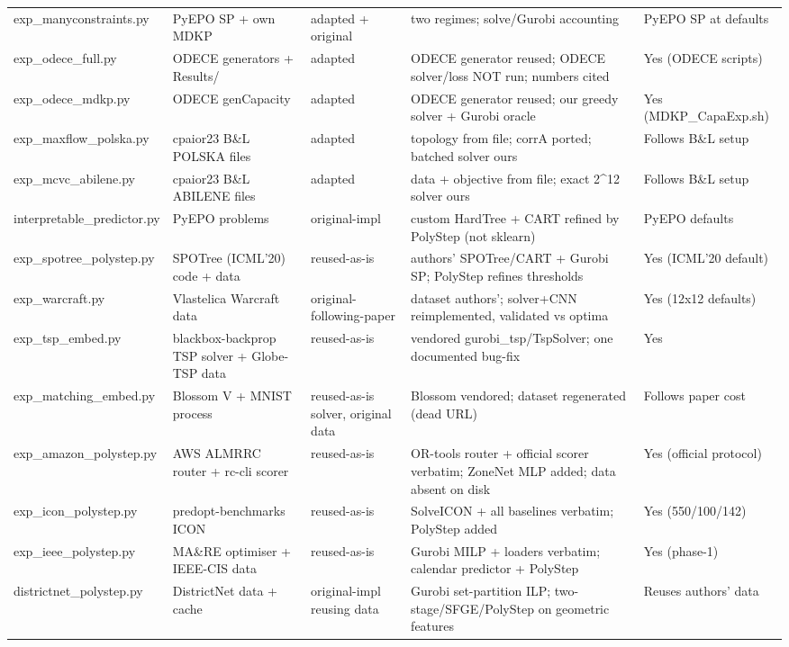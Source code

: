 \documentclass[10pt]{article}
\begin{document}
{\begin{longtable}{p{}p{}p{}p{}p{}}
exp\_manyconstraints.py & PyEPO SP + own MDKP & adapted + original & two regimes; solve/Gurobi accounting & PyEPO SP at defaults \\
exp\_odece\_full.py & ODECE generators + Results/ & adapted & ODECE generator reused; ODECE solver/loss NOT run; numbers cited & Yes (ODECE scripts) \\
exp\_odece\_mdkp.py & ODECE genCapacity & adapted & ODECE generator reused; our greedy solver + Gurobi oracle & Yes (MDKP\_CapaExp.sh) \\
exp\_maxflow\_polska.py & cpaior23 B\&L POLSKA files & adapted & topology from file; corrA ported; batched solver ours & Follows B\&L setup \\
exp\_mcvc\_abilene.py & cpaior23 B\&L ABILENE files & adapted & data + objective from file; exact 2\textasciicircum{}12 solver ours & Follows B\&L setup \\
interpretable\_predictor.py & PyEPO problems & original-impl & custom HardTree + CART refined by PolyStep (not sklearn) & PyEPO defaults \\
exp\_spotree\_polystep.py & SPOTree (ICML'20) code + data & reused-as-is & authors' SPOTree/CART + Gurobi SP; PolyStep refines thresholds & Yes (ICML'20 default) \\
exp\_warcraft.py & Vlastelica Warcraft data & original-following-paper & dataset authors'; solver+CNN reimplemented, validated vs optima & Yes (12x12 defaults) \\
exp\_tsp\_embed.py & blackbox-backprop TSP solver + Globe-TSP data & reused-as-is & vendored gurobi\_tsp/TspSolver; one documented bug-fix & Yes \\
exp\_matching\_embed.py & Blossom V + MNIST process & reused-as-is solver, original data & Blossom vendored; dataset regenerated (dead URL) & Follows paper cost \\
exp\_amazon\_polystep.py & AWS ALMRRC router + rc-cli scorer & reused-as-is & OR-tools router + official scorer verbatim; ZoneNet MLP added; data absent on disk & Yes (official protocol) \\
exp\_icon\_polystep.py & predopt-benchmarks ICON & reused-as-is & SolveICON + all baselines verbatim; PolyStep added & Yes (550/100/142) \\
exp\_ieee\_polystep.py & MA\&RE optimiser + IEEE-CIS data & reused-as-is & Gurobi MILP + loaders verbatim; calendar predictor + PolyStep & Yes (phase-1) \\
districtnet\_polystep.py & DistrictNet data + cache & original-impl reusing data & Gurobi set-partition ILP; two-stage/SFGE/PolyStep on geometric features & Reuses authors' data \\

\end{longtable}}
\end{document}
